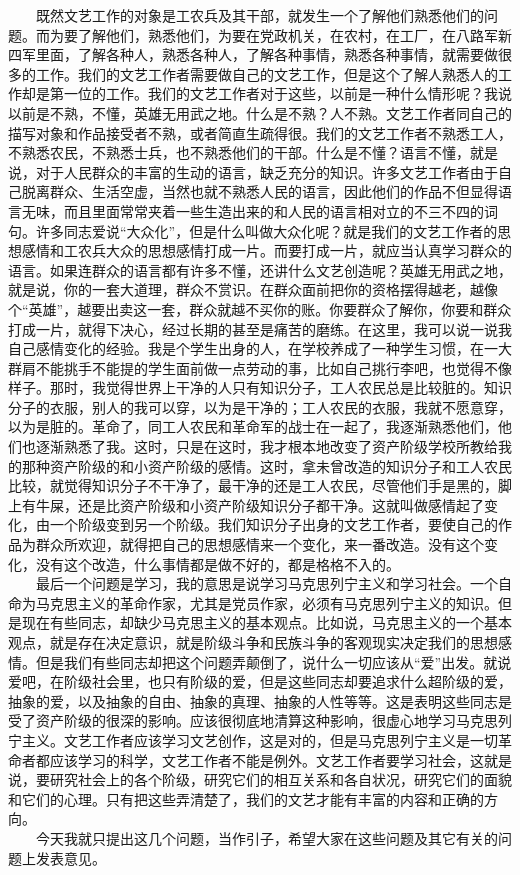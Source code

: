 \documentclass[cn,11pt,chinese]{elegantbook}
\begin{document}
　　既然文艺工作的对象是工农兵及其干部，就发生一个了解他们熟悉他们的问题。而为要了解他们，熟悉他们，为要在党政机关，在农村，在工厂，在八路军新四军里面，了解各种人，熟悉各种人，了解各种事情，熟悉各种事情，就需要做很多的工作。我们的文艺工作者需要做自己的文艺工作，但是这个了解人熟悉人的工作却是第一位的工作。我们的文艺工作者对于这些，以前是一种什么情形呢？我说以前是不熟，不懂，英雄无用武之地。什么是不熟？人不熟。文艺工作者同自己的描写对象和作品接受者不熟，或者简直生疏得很。我们的文艺工作者不熟悉工人，不熟悉农民，不熟悉士兵，也不熟悉他们的干部。什么是不懂？语言不懂，就是说，对于人民群众的丰富的生动的语言，缺乏充分的知识。许多文艺工作者由于自己脱离群众、生活空虚，当然也就不熟悉人民的语言，因此他们的作品不但显得语言无味，而且里面常常夹着一些生造出来的和人民的语言相对立的不三不四的词句。许多同志爱说“大众化”，但是什么叫做大众化呢？就是我们的文艺工作者的思想感情和工农兵大众的思想感情打成一片。而要打成一片，就应当认真学习群众的语言。如果连群众的语言都有许多不懂，还讲什么文艺创造呢？英雄无用武之地，就是说，你的一套大道理，群众不赏识。在群众面前把你的资格摆得越老，越像个“英雄”，越要出卖这一套，群众就越不买你的账。你要群众了解你，你要和群众打成一片，就得下决心，经过长期的甚至是痛苦的磨练。在这里，我可以说一说我自己感情变化的经验。我是个学生出身的人，在学校养成了一种学生习惯，在一大群肩不能挑手不能提的学生面前做一点劳动的事，比如自己挑行李吧，也觉得不像样子。那时，我觉得世界上干净的人只有知识分子，工人农民总是比较脏的。知识分子的衣服，别人的我可以穿，以为是干净的；工人农民的衣服，我就不愿意穿，以为是脏的。革命了，同工人农民和革命军的战士在一起了，我逐渐熟悉他们，他们也逐渐熟悉了我。这时，只是在这时，我才根本地改变了资产阶级学校所教给我的那种资产阶级的和小资产阶级的感情。这时，拿未曾改造的知识分子和工人农民比较，就觉得知识分子不干净了，最干净的还是工人农民，尽管他们手是黑的，脚上有牛屎，还是比资产阶级和小资产阶级知识分子都干净。这就叫做感情起了变化，由一个阶级变到另一个阶级。我们知识分子出身的文艺工作者，要使自己的作品为群众所欢迎，就得把自己的思想感情来一个变化，来一番改造。没有这个变化，没有这个改造，什么事情都是做不好的，都是格格不入的。\\
　　最后一个问题是学习，我的意思是说学习马克思列宁主义和学习社会。一个自命为马克思主义的革命作家，尤其是党员作家，必须有马克思列宁主义的知识。但是现在有些同志，却缺少马克思主义的基本观点。比如说，马克思主义的一个基本观点，就是存在决定意识，就是阶级斗争和民族斗争的客观现实决定我们的思想感情。但是我们有些同志却把这个问题弄颠倒了，说什么一切应该从“爱”出发。就说爱吧，在阶级社会里，也只有阶级的爱，但是这些同志却要追求什么超阶级的爱，抽象的爱，以及抽象的自由、抽象的真理、抽象的人性等等。这是表明这些同志是受了资产阶级的很深的影响。应该很彻底地清算这种影响，很虚心地学习马克思列宁主义。文艺工作者应该学习文艺创作，这是对的，但是马克思列宁主义是一切革命者都应该学习的科学，文艺工作者不能是例外。文艺工作者要学习社会，这就是说，要研究社会上的各个阶级，研究它们的相互关系和各自状况，研究它们的面貌和它们的心理。只有把这些弄清楚了，我们的文艺才能有丰富的内容和正确的方向。\\
　　今天我就只提出这几个问题，当作引子，希望大家在这些问题及其它有关的问题上发表意见。\\
\end{document}
